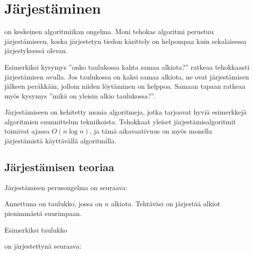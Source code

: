 \chapter{Järjestäminen}


on keskeinen algoritmiikan ongelma.
Moni tehokas algoritmi
perustuu järjestämiseen,
koska järjestetyn tiedon
käsittely on helpompaa
kuin sekalaisessa järjestyksessä olevan.

Esimerkiksi kysymys ''onko taulukossa kahta samaa
alkiota?'' ratkeaa tehokkaasti järjestämisen avulla.
Jos taulukossa on kaksi samaa alkiota,
ne ovat järjestämisen jälkeen peräkkäin,
jolloin niiden löytäminen on helppoa.
Samaan tapaan ratkeaa myös kysymys
''mikä on yleisin alkio taulukossa?''.

Järjestämiseen on kehitetty monia
algoritmeja, jotka tarjoavat hyviä
esimerkkejä algoritmien suunnittelun tekniikoista.
Tehokkaat yleiset järjestämis\-algoritmit
toimivat ajassa $O(n \log n)$, ja tämä aikavaativuus
on myös monella järjestämistä käyttävällä algoritmilla.

\section{Järjestämisen teoriaa}

Järjestämisen perusongelma on seuraava:
\begin{task}
Annettuna on taulukko, jossa on $n$ alkiota.
Tehtäväsi on järjestää alkiot pienimmästä
suurimpaan.
\end{task}
\noindent
Esimerkiksi taulukko
\begin{center}
\end{center}
on järjestettynä seuraava:
\begin{center}
\end{center}

